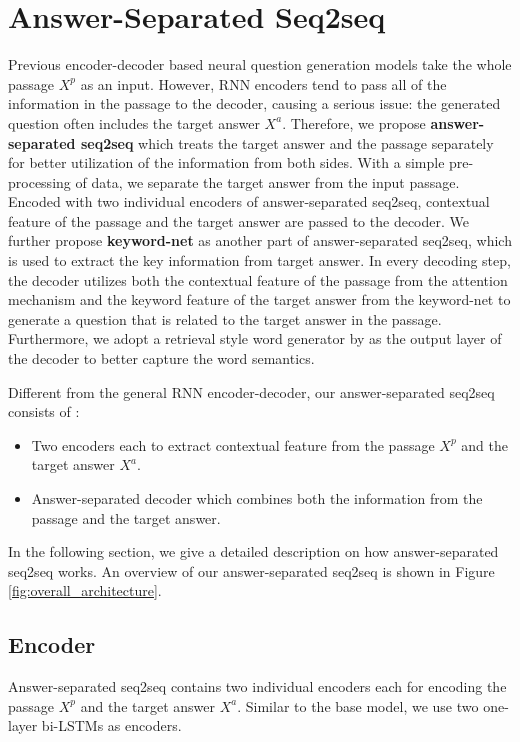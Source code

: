 \documentclass[letterpaper]{article} %
\begin{document}
\section{Answer-Separated Seq2seq}
Previous encoder-decoder based neural question generation models take the whole passage \(X^p\) as an input. However, RNN encoders tend to pass all of the information in the passage to the decoder, causing a serious issue: the generated question often includes the target answer \(X^a\). Therefore, we propose \textbf{answer-separated seq2seq} which treats the target answer and the passage separately for better utilization of the information from both sides. With a simple pre-processing of data, we separate the target answer from the input passage. Encoded with two individual encoders of answer-separated seq2seq, contextual feature of the passage and the target answer are passed to the decoder. We further propose \textbf{keyword-net} as another part of answer-separated seq2seq, which is used to extract the key information from target answer.  In every decoding step, the decoder utilizes both the contextual feature of the passage from the attention mechanism and the keyword feature of the target answer from the keyword-net to generate a question that is related to the target answer in the passage. Furthermore, we adopt a retrieval style word generator by \cite{ma2018query} as the output layer of the decoder to better capture the word semantics.

Different from the general RNN encoder-decoder, our answer-separated seq2seq consists of :
\begin{itemize}
\item Two encoders each to extract contextual feature from the passage \(X^p\) and the target answer \(X^a\).
\item Answer-separated decoder which combines both the information from the passage and the target answer.
\end{itemize}

In the following section, we give a detailed description on how answer-separated seq2seq works. An overview of our answer-separated seq2seq is shown in Figure \ref{fig:overall_architecture}.

\subsection{Encoder}
Answer-separated seq2seq contains two individual encoders each for encoding the passage \(X^p\) and the target answer \(X^a\). Similar to the base model, we use two one-layer bi-LSTMs as encoders.
\end{document}

